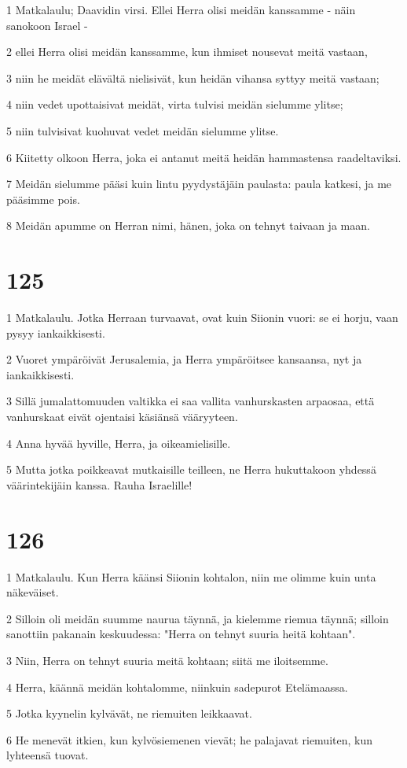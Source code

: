 \par 1 Matkalaulu; Daavidin virsi. Ellei Herra olisi meidän kanssamme - näin sanokoon Israel -
\par 2 ellei Herra olisi meidän kanssamme, kun ihmiset nousevat meitä vastaan,
\par 3 niin he meidät elävältä nielisivät, kun heidän vihansa syttyy meitä vastaan;
\par 4 niin vedet upottaisivat meidät, virta tulvisi meidän sielumme ylitse;
\par 5 niin tulvisivat kuohuvat vedet meidän sielumme ylitse.
\par 6 Kiitetty olkoon Herra, joka ei antanut meitä heidän hammastensa raadeltaviksi.
\par 7 Meidän sielumme pääsi kuin lintu pyydystäjäin paulasta: paula katkesi, ja me pääsimme pois.
\par 8 Meidän apumme on Herran nimi, hänen, joka on tehnyt taivaan ja maan.

\chapter{125}

\par 1 Matkalaulu. Jotka Herraan turvaavat, ovat kuin Siionin vuori: se ei horju, vaan pysyy iankaikkisesti.
\par 2 Vuoret ympäröivät Jerusalemia, ja Herra ympäröitsee kansaansa, nyt ja iankaikkisesti.
\par 3 Sillä jumalattomuuden valtikka ei saa vallita vanhurskasten arpaosaa, että vanhurskaat eivät ojentaisi käsiänsä vääryyteen.
\par 4 Anna hyvää hyville, Herra, ja oikeamielisille.
\par 5 Mutta jotka poikkeavat mutkaisille teilleen, ne Herra hukuttakoon yhdessä väärintekijäin kanssa. Rauha Israelille!

\chapter{126}

\par 1 Matkalaulu. Kun Herra käänsi Siionin kohtalon, niin me olimme kuin unta näkeväiset.
\par 2 Silloin oli meidän suumme naurua täynnä, ja kielemme riemua täynnä; silloin sanottiin pakanain keskuudessa: "Herra on tehnyt suuria heitä kohtaan".
\par 3 Niin, Herra on tehnyt suuria meitä kohtaan; siitä me iloitsemme.
\par 4 Herra, käännä meidän kohtalomme, niinkuin sadepurot Etelämaassa.
\par 5 Jotka kyynelin kylvävät, ne riemuiten leikkaavat.
\par 6 He menevät itkien, kun kylvösiemenen vievät; he palajavat riemuiten, kun lyhteensä tuovat.

